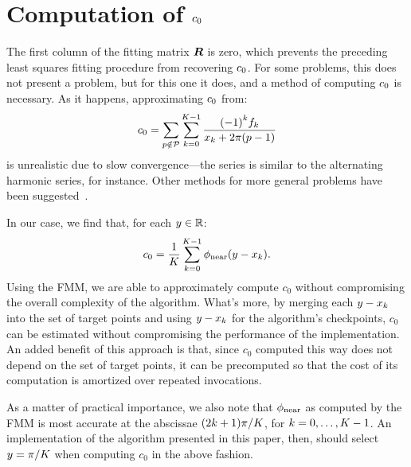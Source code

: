 \section{Computation of ${c}_{0}$}

The first column of the fitting matrix $\boldsymbol{R}$ is zero, which prevents
the preceding least squares fitting procedure from recovering
${c}_{0}$. For some problems, this does not present a problem,
but for this one it does, and a method of computing ${c}_{0}$
is necessary. As it happens, approximating ${c}_{0}$ from:
\begin{align}
  \label{eq:c0-direct}
  {c}_{0} = \sum_{p\notin\mathcal{P}}\sum_{k=0}^{K-1} \frac{{(-1)}^k {f}_{k}}{{x}_{k} + 2\pi(p - 1)}
\end{align}
is unrealistic due to slow convergence---the series is similar to the
alternating harmonic series, for instance. Other methods for more
general problems have been suggested~\cite{periodic-sums}.

In our case, we find that, for each $y\in\mathbb{R}$:
\begin{align}\label{eq:c0-est}
  c_0 = \frac{1}{K} \sum_{k=0}^{K-1} \phi_{\operatorname{near}}(y - {x}_{k}).
\end{align}
Using the FMM, we are able to approximately compute $c_0$ without
compromising the overall complexity of the algorithm. What's more, by
merging each $y - {x}_{k}$ into the set of target points
and using $y - {x}_{k}$ for the algorithm's checkpoints,
$c_0$ can be estimated without compromising the performance of the
implementation. An added benefit of this approach is that, since $c_0$
computed this way does not depend on the set of target points, it can
be precomputed so that the cost of its computation is amortized over
repeated invocations.

As a matter of practical importance, we also note that $\phi_{\operatorname{near}}$ as
computed by the FMM is most accurate at the abscissae
$(2k + 1)\pi{}/K$, for
$k = 0, \hdots, K - 1$. An implementation of the algorithm
presented in this paper, then, should select $y = \pi/K$ when
computing $c_0$ in the above fashion.

